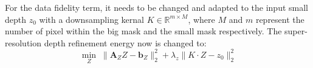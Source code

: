 For the data fidelity term, it needs to be changed and adapted to the input small depth $z_0$ with a downsampling kernal $K \in \mathbb{R}^{m\times M}$, where $M$ and $m$ represent the number of pixel within the big mask and the small mask respectively.
The super-resolution depth refinement energy now is changed to:
 \begin{equation}\label{eq:robust_depth_estimate}
	\min_{Z} \; \lVert  \mathbf{A}_{Z}Z - \mathbf{b}_Z\rVert^2_2 + \lambda_{z}\lVert K\cdot Z - z_0 \rVert_2^2
\end{equation}

